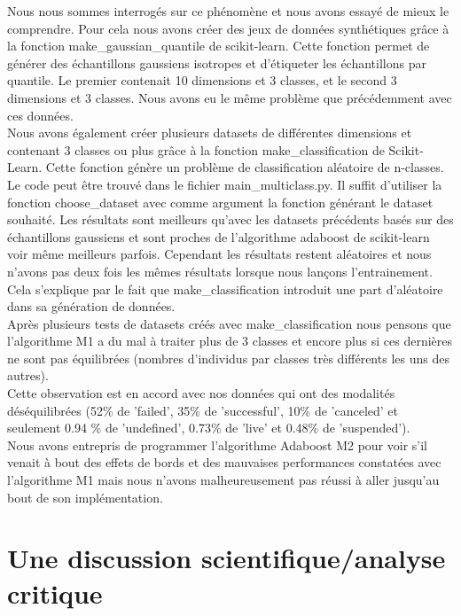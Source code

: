 \documentclass{article}
\begin{document}
Nous nous sommes interrogés sur ce phénomène et nous avons essayé de mieux le comprendre. Pour cela nous avons créer des jeux de données synthétiques grâce à la fonction make\_gaussian\_quantile de scikit-learn. Cette fonction permet de générer des échantillons gaussiens isotropes et d'étiqueter les échantillons par quantile. Le premier contenait 10 dimensions et 3 classes, et le second 3 dimensions et 3 classes. Nous avons eu le même problème que précédemment avec ces données. \\

Nous avons également créer plusieurs datasets de différentes dimensions et contenant 3 classes ou plus grâce à la fonction make\_classification de Scikit-Learn. Cette fonction génère un problème de classification aléatoire de n-classes. Le code peut être trouvé dans le fichier main\_multiclass.py. Il suffit d'utiliser la fonction choose\_dataset avec comme argument la fonction générant le dataset souhaité. Les résultats sont meilleurs qu'avec les datasets précédents basés sur des échantillons gaussiens et sont proches de l'algorithme adaboost de scikit-learn voir même meilleurs parfois. Cependant les résultats restent aléatoires et nous n'avons pas deux fois les mêmes résultats lorsque nous lançons l'entrainement. Cela s'explique par le fait que make\_classification introduit une part d'aléatoire dans sa génération de données. \\

Après plusieurs tests de datasets créés avec make\_classification nous pensons que l'algorithme M1 a du mal à traiter plus de 3 classes et encore plus si ces dernières ne sont pas équilibrées (nombres d'individus par classes très différents les uns des autres).\\ 

Cette observation est en accord avec nos données qui ont des modalités déséquilibrées (52\% de 'failed', 35\% de 'successful', 10\% de 'canceled' et seulement 0.94 \% de 'undefined', 0.73\% de 'live' et 0.48\% de 'suspended'). \\

Nous avons entrepris de programmer l'algorithme Adaboost M2  pour voir s'il venait à bout des effets de bords  et des mauvaises performances constatées avec l'algorithme M1 mais nous n'avons malheureusement pas réussi à aller jusqu'au bout de son implémentation. 

\section{Une discussion scientifique/analyse critique}
\end{document}
